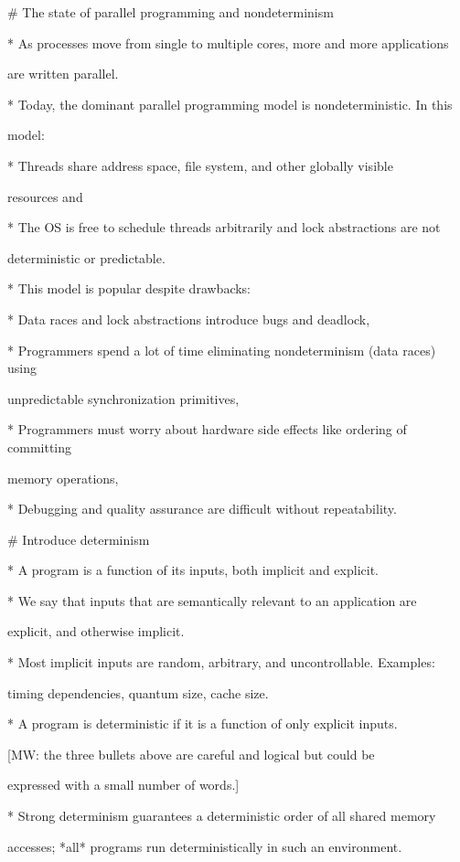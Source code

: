 

# The state of parallel programming and nondeterminism

* As processes move from single to multiple cores, more and more applications

  are written parallel.

* Today, the dominant parallel programming model is nondeterministic. In this

  model:

* Threads share address space, file system, and other globally visible

  resources and

* The OS is free to schedule threads arbitrarily and lock abstractions are not

  deterministic or predictable.

* This model is popular despite drawbacks:

* Data races and lock abstractions introduce bugs and deadlock,

* Programmers spend a lot of time eliminating nondeterminism (data races) using

  unpredictable synchronization primitives,

* Programmers must worry about hardware side effects like ordering of committing

  memory operations,

* Debugging and quality assurance are difficult without repeatability.



# Introduce determinism

* A program is a function of its inputs, both implicit and explicit.

* We say that inputs that are semantically relevant to an application are

  explicit, and otherwise implicit.

* Most implicit inputs are random, arbitrary, and uncontrollable. Examples:

  timing dependencies, quantum size, cache size.

* A program is deterministic if it is a function of only explicit inputs.

[MW: the three bullets above are careful and logical but could be

expressed with a small number of words.]

* Strong determinism guarantees a deterministic order of all shared memory

  accesses; *all* programs run deterministically in such an environment.

